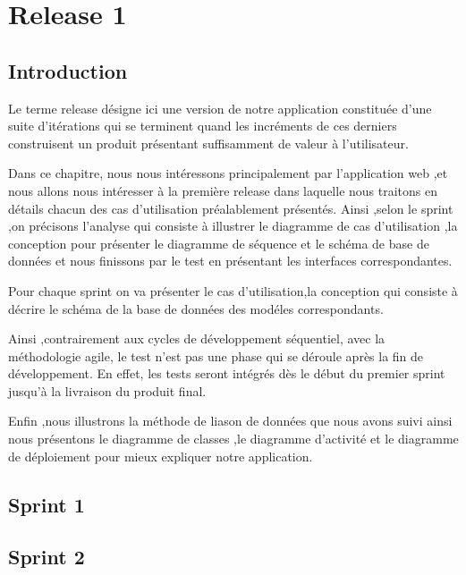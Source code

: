 \chapter{Release 1}
\section{Introduction}


Le terme release d\'{e}signe ici une version de notre application constitu\'{e}e d'une suite d'it\'{e}rations
qui se terminent quand les incr\'{e}ments de ces derniers construisent un produit pr\'{e}sentant
suffisamment de valeur \`{a} l'utilisateur.

Dans ce chapitre, nous nous intéressons principalement par l'application web ,et nous allons nous int\'{e}resser \`{a} la premi\`{e}re release dans laquelle nous traitons en d\'{e}tails chacun des cas d'utilisation pr\'{e}alablement pr\'{e}sent\'{e}s.
Ainsi ,selon le sprint ,on précisons l'analyse qui consiste  \`{a} illustrer le diagramme de cas d'utilisation ,la conception pour pr\'{e}senter
le diagramme de s\'{e}quence et le sch\'{e}ma  de base de donn\'{e}es et nous finissons par le test en pr\'{e}sentant
les interfaces correspondantes.

Pour chaque sprint on va pr\'{e}senter le cas d'utilisation,la conception qui consiste \`{a} d\'{e}crire
le sch\'{e}ma de la base de donn\'{e}es  des mod\'{e}les correspondants.

Ainsi ,contrairement aux cycles de d\'{e}veloppement s\'{e}quentiel, avec la m\'{e}thodologie agile, le test n'est
pas une phase qui se d\'{e}roule apr\`{e}s la fin de d\'{e}veloppement. En effet, les tests seront int\'{e}gr\'{e}s
d\`{e}s le d\'{e}but du premier sprint jusqu'\`{a} la livraison du produit final.

Enfin ,nous illustrons  la m\'{e}thode de liason de donn\'{e}es que nous avons suivi 
ainsi nous présentons le diagramme de classes ,le diagramme  d'activit\'{e} et le diagramme  de d\'{e}ploiement 
pour mieux expliquer notre application.


\section{ Sprint 1 }


\section{ Sprint 2 }


